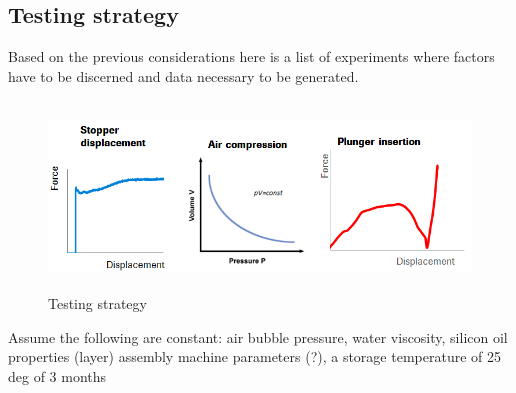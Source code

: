 \newpage
\subsection{Testing strategy}
Based on the previous considerations here is a list of experiments where factors have to be discerned and data necessary to be generated.

\begin{figure}[h!]	
	\centering
\includegraphics[height=5cm]{img/tests.PNG}
   \caption{Testing strategy}
 \label{fgr:PFS}
\end{figure}

Assume the following are constant: air bubble pressure, water viscosity, silicon oil properties (layer) assembly machine parameters (?), a storage temperature of 25 deg of 3 months